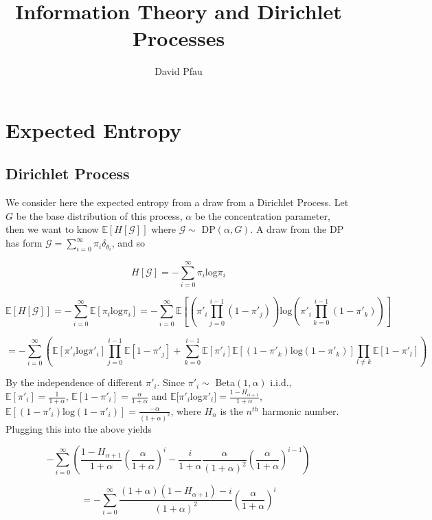 \documentclass[11pt]{article}
\title{Information Theory and Dirichlet Processes}
\author{David Pfau}
\newcommand{\Log}{\mathrm{log}}
\newcommand{\E}{\mathbb{E}}
\newcommand{\G}{\mathcal{G}}
\begin{document}
\maketitle

\section{Expected Entropy}

\subsection{Dirichlet Process}

We consider here the expected entropy from a draw from a Dirichlet Process.  Let $G$ be the base distribution of this process, $\alpha$ be the concentration parameter, then we want to know $\mathbb{E}[H[\G]]$ where $\G \sim$ DP$(\alpha,G)$.  A draw from the DP has form $\G = \sum_{i=0}^\infty \pi_i \delta_{\theta_i}$, and so

\[
H[\G] = -\sum_{i=0}^\infty \pi_i \Log\pi_i
\]

\[
\E[H[\G]] = -\sum_{i=0}^\infty \E[\pi_i \Log\pi_i] = -\sum_{i=0}^\infty \E\left[\left(\pi'_i\prod_{j=0}^{i-1} (1-\pi'_j)\right)\Log\left(\pi'_i\prod_{k=0}^{i-1} (1-\pi'_k)\right)\right] 
\]

\[
= -\sum_{i=0}^\infty \left(\E[\pi'_i\Log\pi'_i]\prod_{j=0}^{i-1}\E[1-\pi'_j] + \sum_{k=0}^{i-1}\E[\pi'_i]\E[(1-\pi'_k)\Log(1-\pi'_k)]\prod_{l \neq k} \E[1-\pi'_l]\right)
\]

By the independence of different $\pi'_i$.  Since $\pi'_i \sim$ Beta$(1,\alpha)$ i.i.d., $\E[\pi'_i] = \frac{1}{1+\alpha}$, $\E[1-\pi'_i] = \frac{\alpha}{1+\alpha}$ and $\E[\pi'_i$log$\pi'_i] = \frac{1-H_{\alpha+1}}{1+\alpha}$, $\E[(1-\pi'_i)\Log(1-\pi'_i)] = \frac{-\alpha}{(1+\alpha)^2}$, where $H_{n}$ is the $n^{th}$ harmonic number.  Plugging this into the above yields

\[
-\sum_{i=0}^\infty \left( \frac{1-H_{\alpha+1}}{1+\alpha}\left(\frac{\alpha}{1+\alpha}\right)^i - \frac{i}{1+\alpha}\frac{\alpha}{(1+\alpha)^2}\left(\frac{\alpha}{1+\alpha}\right)^{i-1}\right)
\]

\[
= -\sum_{i=0}^\infty \frac{(1+\alpha)(1-H_{\alpha+1}) - i}{(1+\alpha)^2}\left(\frac{\alpha}{1+\alpha}\right)^i 
\]
\end{document}
